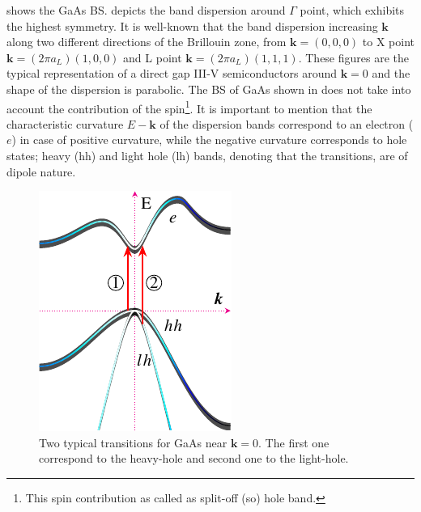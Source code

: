  shows  the GaAs \gls{BS}.  depicts the band dispersion around $\Gamma$ point, which exhibits the highest symmetry.  It is well-known that the band dispersion increasing $\boldsymbol{k}$ along two different directions of the Brillouin zone, from $\boldsymbol{k}=(0,0,0)$ to X point $\boldsymbol{k}=(2\pi a_{L})(1,0,0)$ and L point $\boldsymbol{k}=(2\pi a_{L})(1,1,1)$. These figures are the typical representation of a direct gap III-V semiconductors around  $\boldsymbol{k}=0$ and the shape of the dispersion is parabolic. The BS of GaAs shown in  does not take into account the contribution of the spin\footnote{This spin contribution as called as split-off (so) hole band.}.  It is important to mention that the characteristic curvature $E\!\!-\!\!\boldsymbol{k}$ of the dispersion bands correspond to an electron ($e$) in case of positive curvature, while the negative curvature corresponds to hole states; heavy (hh) and light hole (lh) bands, denoting that the transitions, are of dipole nature\cite{fox2002optical,cardona2005fundamentals}. 
\begin{figure}[h!]
	\centering
		\includegraphics[width=0.5\linewidth]{../figures/chapter-1/bands/build/bands02}
	\caption{Two typical transitions for GaAs near $\boldsymbol{k}=0$. The first one correspond to the heavy-hole and second one to the light-hole. }
	\label{fig:subsubsection-1.1.1-GaAsbands-2}
\end{figure}

